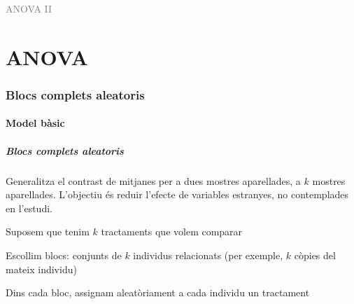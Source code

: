 \documentclass[12pt,t]{beamer}
\title[\red{Matemàtiques III}]{}
\author[]{}
\date{}
\newcommand{\gray}[1]{\textcolor{gray}{#1}}
\renewcommand{\emph}[1]{{\color{red}#1}}
\theoremstyle{plain}
\theoremstyle{definition}
\begin{document}
\beamertemplatedotitem

\lstset{breaklines=true}
\lstset{basicstyle=\ttfamily}



\begin{frame}
\vfill
\begin{center}
\gray{\LARGE ANOVA II}
\end{center}
\vfill
\end{frame}



\part{ANOVA}
% 

 
\section{Blocs complets aleatoris}
\subsection{Model bàsic}
\begin{frame}
\frametitle{Blocs complets aleatoris}

Generalitza el contrast de mitjanes  per a dues mostres aparellades, a $k$ mostres aparellades. L'objectiu és reduir l'efecte de variables estranyes, no contemplades en l'estudi.
\medskip

Suposem que tenim $k$ tractaments que volem comparar
\medskip

Escollim \emph{blocs}: conjunts de $k$ individus relacionats  (per exemple, $k$ còpies del mateix individu)
\medskip

Dins cada bloc, assignam aleatòriament a cada individu un tractament
\end{frame}
\end{document}

